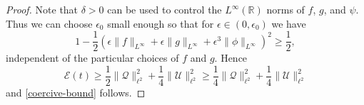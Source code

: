 \documentclass[oneside,reqno]{amsart}
\newcommand{\R}{\mathbb{R}}
\begin{document}
\begin{proof}
	Note that \(\delta>0\) can be used to control the \(L^\infty(\R)\) norms of \(f\), \(g\), and \(\psi\). Thus we can choose \(\epsilon_0\) small enough so that for \(\epsilon \in (0,\epsilon_0)\) we have 
	\begin{equation*}
		1 - \frac 12 \left( \epsilon \| f\|_{L^\infty} + \epsilon \|g\|_{L^\infty} + \epsilon^3 \| \phi \|_{L^\infty} \right)^2 \geq \frac 12,
	\end{equation*}
	independent of the particular choices of \(f\) and \(g\). 	Hence
	\begin{equation*}
		\mathcal E(t) \geq \frac 1 2 \| \mathcal Q \|_{\ell^2}^2 + \frac 1 4 \| \mathcal U\|_{\ell^2}^2 \geq \frac 1 4\| \mathcal Q \|_{\ell^2}^2 + \frac 1 4 \| \mathcal U\|_{\ell^2}^2
	\end{equation*}
	and \cref{coercive-bound} follows.
	

\end{proof}
\end{document}
